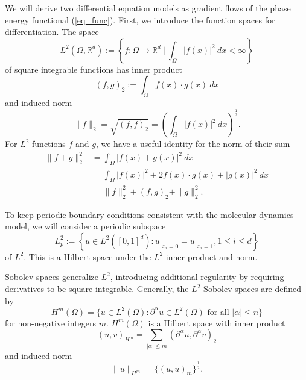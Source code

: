 \documentclass[12pt, reqno]{report}
\theoremstyle{definition}
\theoremstyle{remark}
\begin{document}
We will derive two differential equation models as gradient flows of the phase energy functional (\ref{eq_func}). First, we introduce the function spaces for differentiation. 
The space
\begin{equation} \label{eq_l2space}
    L^{2}(\Omega,\mathbb{R}^{d}):=\left\{f\colon \Omega\to \mathbb{R}^{d}~\bigg|~\int_{\Omega}|f(x)|^{2}~dx<\infty\right\}
\end{equation}
of square integrable functions has inner product
\begin{equation} \label{eq_l2ip}
    ( f,g)_{2}:=\int_{\Omega}f(x)\cdot g(x)~dx
\end{equation}
and induced norm 
\begin{equation} \label{eq_l2norm}
    \|f\|_{2}=\sqrt{( f,f)_{2}}=\left(\int_{\Omega}|f(x)|^{2}\ dx\right)^{\frac{1}{2}}.
\end{equation}
For $L^2$ functions $f$ and $g$, we have a useful identity for the norm of their sum
\begin{equation}\label{eq_l2normsum}
    \begin{split} 
        \|f+g\|_{2}^{2}&=\int_{\Omega}|f(x)+g(x)|^{2}~dx\\
        &=\int_{\Omega}|f(x)|^{2}+2f(x)\cdot g(x)+|g(x)|^{2}~dx\\
        &=\|f\|^{2}_{2}+( f,g)_{2}+\|g\|^{2}_{2}.
    \end{split}
\end{equation}

To keep periodic boundary conditions consistent with the molecular dynamics model, we will consider a periodic subspace
\begin{equation} 
    L_{p}^{2}:=\left\{u\in L^{2}([0,1]^{d}):u\big|_{x_{i}=0}=u\big|_{x_{i}=1},1\le i\le d\right\}
\end{equation}
of $L^{2}$.
This is a Hilbert space under the $L^{2}$ inner product and norm. 

Sobolev spaces generalize $L^2$, introducing additional regularity by requiring derivatives to be square-integrable. Generally, the $L^{2}$ Sobolev spaces are defined by 
\begin{equation}
    H^{m}(\Omega)=\{u\in L^{2}(\Omega):\partial ^{\alpha}u\in L^{2}(\Omega)\text{ for all }|\alpha|\le n\}
\end{equation}
for non-negative integers $m$. 
$H^{m}(\Omega)$ is a Hilbert space with inner product 
\begin{equation} \label{eq_IP}
    (u,v)_{H^{m}}=\sum_{|\alpha|\le m}(\partial ^{\alpha}u,\partial ^{\alpha}v)_{2}
\end{equation}
and induced norm
\begin{equation} 
    \|u\|_{H^{m}}=\{(u,u)_{m}\}^{\frac{1}{2}}.
\end{equation}
\end{document}
